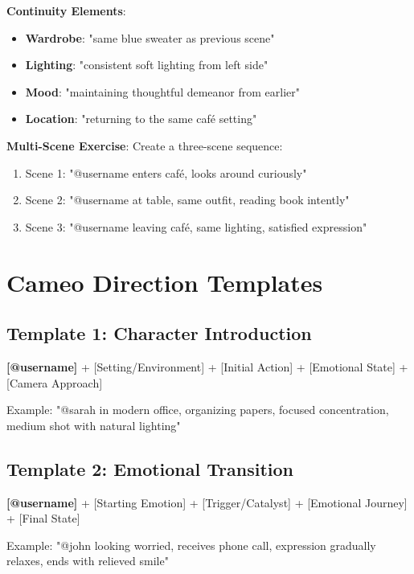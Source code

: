 \textbf{Continuity Elements}:
\begin{itemize}
\item \textbf{Wardrobe}: "same blue sweater as previous scene"
\item \textbf{Lighting}: "consistent soft lighting from left side"
\item \textbf{Mood}: "maintaining thoughtful demeanor from earlier"
\item \textbf{Location}: "returning to the same café setting"
\end{itemize}

\textbf{Multi-Scene Exercise}:
Create a three-scene sequence:
\begin{enumerate}
\item Scene 1: "@username enters café, looks around curiously"
\item Scene 2: "@username at table, same outfit, reading book intently"
\item Scene 3: "@username leaving café, same lighting, satisfied expression"
\end{enumerate}

\section*{Cameo Direction Templates}

\subsection*{Template 1: Character Introduction}
\begin{Prompt}
\textbf{[@username]} + [Setting/Environment] + [Initial Action] + [Emotional State] + [Camera Approach]

Example: "@sarah in modern office, organizing papers, focused concentration, medium shot with natural lighting"
\end{Prompt}

\subsection*{Template 2: Emotional Transition}
\begin{Prompt}
\textbf{[@username]} + [Starting Emotion] + [Trigger/Catalyst] + [Emotional Journey] + [Final State]

Example: "@john looking worried, receives phone call, expression gradually relaxes, ends with relieved smile"
\end{Prompt}

